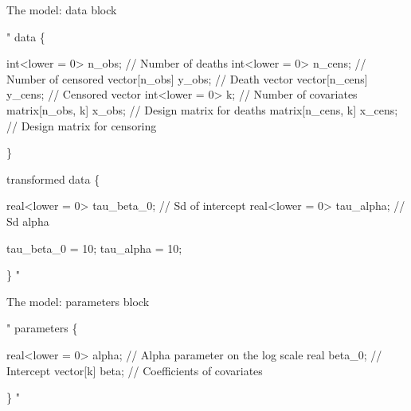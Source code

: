 \documentclass[ignorenonframetext,a4paper]{beamer}
\newenvironment{Shaded}{\begin{snugshade}}{\end{snugshade}}
\newcommand{\StringTok}[1]{\textcolor[rgb]{0.31,0.60,0.02}{#1}}
\begin{document}
\begin{frame}[fragile]{The model: data block}

\scriptsize

\begin{Shaded}
\begin{Highlighting}[]
\StringTok{"}
\StringTok{data \{}

\StringTok{  int<lower = 0> n_obs;             // Number of deaths}
\StringTok{  int<lower = 0> n_cens;            // Number of censored}
\StringTok{  vector[n_obs] y_obs;              // Death vector}
\StringTok{  vector[n_cens] y_cens;            // Censored vector}
\StringTok{  int<lower = 0> k;                 // Number of covariates}
\StringTok{  matrix[n_obs, k] x_obs;           // Design matrix for deaths}
\StringTok{  matrix[n_cens, k] x_cens;         // Design matrix for censoring}

\StringTok{\}}

\StringTok{transformed data \{}

\StringTok{  real<lower = 0> tau_beta_0;       // Sd of intercept}
\StringTok{  real<lower = 0> tau_alpha;        // Sd alpha}

\StringTok{  tau_beta_0 = 10;}
\StringTok{  tau_alpha = 10;}

\StringTok{\}}
\StringTok{"}
\end{Highlighting}
\end{Shaded}

\end{frame}

\begin{frame}[fragile]{The model: parameters block}

\scriptsize

\begin{Shaded}
\begin{Highlighting}[]
\StringTok{"}
\StringTok{parameters \{}

\StringTok{  real<lower = 0> alpha;           // Alpha parameter on the log scale}
\StringTok{  real beta_0;                     // Intercept}
\StringTok{  vector[k] beta;                  // Coefficients of covariates}

\StringTok{\}}
\StringTok{"}
\end{Highlighting}
\end{Shaded}

\end{frame}
\end{document}
